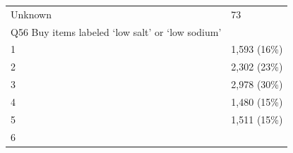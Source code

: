 \documentclass[]{article}
\begin{document}
\begin{longtable}[]{@{}ll@{}}
\begin{minipage}[t]{0.71\columnwidth}\raggedright
Unknown\strut
\end{minipage} & \begin{minipage}[t]{0.23\columnwidth}\raggedright
73\strut
\end{minipage}\tabularnewline
\begin{minipage}[t]{0.71\columnwidth}\raggedright
Q56 Buy items labeled `low salt' or `low sodium'\strut
\end{minipage} & \begin{minipage}[t]{0.23\columnwidth}\raggedright
\strut
\end{minipage}\tabularnewline
\begin{minipage}[t]{0.71\columnwidth}\raggedright
1\strut
\end{minipage} & \begin{minipage}[t]{0.23\columnwidth}\raggedright
1,593 (16\%)\strut
\end{minipage}\tabularnewline
\begin{minipage}[t]{0.71\columnwidth}\raggedright
2\strut
\end{minipage} & \begin{minipage}[t]{0.23\columnwidth}\raggedright
2,302 (23\%)\strut
\end{minipage}\tabularnewline
\begin{minipage}[t]{0.71\columnwidth}\raggedright
3\strut
\end{minipage} & \begin{minipage}[t]{0.23\columnwidth}\raggedright
2,978 (30\%)\strut
\end{minipage}\tabularnewline
\begin{minipage}[t]{0.71\columnwidth}\raggedright
4\strut
\end{minipage} & \begin{minipage}[t]{0.23\columnwidth}\raggedright
1,480 (15\%)\strut
\end{minipage}\tabularnewline
\begin{minipage}[t]{0.71\columnwidth}\raggedright
5\strut
\end{minipage} & \begin{minipage}[t]{0.23\columnwidth}\raggedright
1,511 (15\%)\strut
\end{minipage}\tabularnewline
\begin{minipage}[t]{0.71\columnwidth}\raggedright
6\strut
\end{minipage} & \begin{minipage}[t]{0.23\columnwidth}\raggedright

\end{minipage}
\end{longtable}
\end{document}
